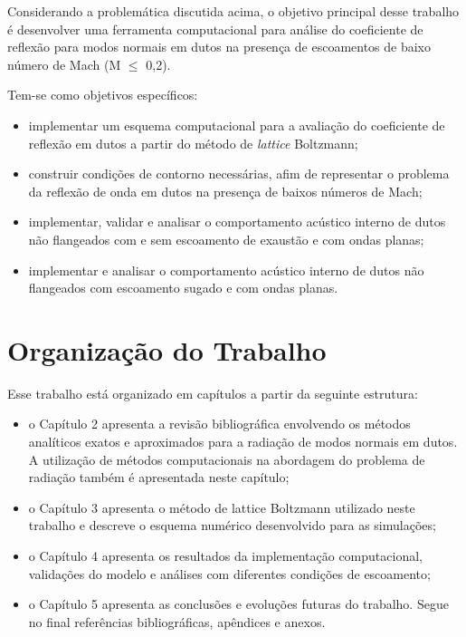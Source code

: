 Considerando a problemática discutida acima, o objetivo principal desse trabalho é desenvolver uma ferramenta computacional para análise do coeficiente de reflexão para modos normais em dutos na presença de escoamentos de baixo número de Mach (M $\leq$ 0,2).

Tem-se como objetivos específicos:
\begin{itemize}
    \item implementar um esquema computacional para a avaliação do coeficiente de reflexão em dutos a partir do método de \textit{lattice} Boltzmann;
    \item construir condições de contorno necessárias, afim de representar o problema da reflexão de onda em dutos na presença de baixos números de Mach;
    \item implementar, validar e analisar o comportamento acústico interno de dutos não flangeados com e sem escoamento de exaustão e com ondas planas;
    \item implementar e analisar o comportamento acústico interno de dutos não flangeados com escoamento sugado e com ondas planas.
\end{itemize}

\section{Organização do Trabalho}

Esse trabalho está organizado em capítulos a partir da seguinte estrutura: 

\begin{itemize}
	\item o Capítulo 2 apresenta a revisão bibliográfica envolvendo os métodos analíticos exatos e aproximados para a radiação de modos normais em dutos. A utilização de métodos computacionais na abordagem do problema de radiação também é apresentada neste capítulo;
	\item o Capítulo 3 apresenta o método de lattice Boltzmann utilizado neste trabalho e descreve o esquema numérico desenvolvido para as simulações;
	\item o Capítulo 4 apresenta os resultados da implementação computacional, validações do modelo e análises com diferentes condições de escoamento;
	\item o Capítulo 5 apresenta as conclusões e evoluções futuras do trabalho. Segue no final referências bibliográficas, apêndices e anexos.
\end{itemize}